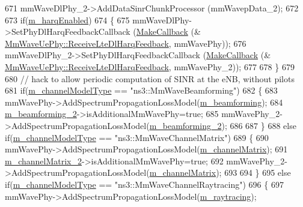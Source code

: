 \begin{DoxyCode}
671         mmWaveDlPhy\_2->AddDataSinrChunkProcessor (mmWavepData\_2);
672 
673         \textcolor{keywordflow}{if}(\hyperlink{classns3_1_1MmWaveHelper_a56142ee76b853ab0fa13918aeb6800e9}{m\_harqEnabled})
674         \{
675                 mmWaveDlPhy->SetPhyDlHarqFeedbackCallback (\hyperlink{group__makecallbackmemptr_ga9376283685aa99d204048d6a4b7610a4}{MakeCallback} (&
      \hyperlink{classns3_1_1MmWaveUePhy_ac00ac37c527f89a4e7a585cef8b95f4d}{MmWaveUePhy::ReceiveLteDlHarqFeedback}, mmWavePhy));
676                 mmWaveDlPhy\_2->SetPhyDlHarqFeedbackCallback (\hyperlink{group__makecallbackmemptr_ga9376283685aa99d204048d6a4b7610a4}{MakeCallback} (&
      \hyperlink{classns3_1_1MmWaveUePhy_ac00ac37c527f89a4e7a585cef8b95f4d}{MmWaveUePhy::ReceiveLteDlHarqFeedback}, mmWavePhy\_2));
677 
678         \}
679 
680         \textcolor{comment}{// hack to allow periodic computation of SINR at the eNB, without pilots}
681         \textcolor{keywordflow}{if}(\hyperlink{classns3_1_1MmWaveHelper_aec88d691230f0db9448a7f953301bb24}{m\_channelModelType} == \textcolor{stringliteral}{"ns3::MmWaveBeamforming"})
682         \{
683                 mmWavePhy->AddSpectrumPropagationLossModel(\hyperlink{classns3_1_1MmWaveHelper_a4fa071b6d755f32a684906150660b381}{m\_beamforming});
684                 \hyperlink{classns3_1_1MmWaveHelper_a3406a28781481686589a5275787bf43f}{m\_beamforming\_2}->isAdditionalMmWavePhy=\textcolor{keyword}{true};
685                 mmWavePhy\_2->AddSpectrumPropagationLossModel(\hyperlink{classns3_1_1MmWaveHelper_a3406a28781481686589a5275787bf43f}{m\_beamforming\_2});
686 
687         \}
688         \textcolor{keywordflow}{else} \textcolor{keywordflow}{if}(\hyperlink{classns3_1_1MmWaveHelper_aec88d691230f0db9448a7f953301bb24}{m\_channelModelType} == \textcolor{stringliteral}{"ns3::MmWaveChannelMatrix"})
689         \{
690                 mmWavePhy->AddSpectrumPropagationLossModel(\hyperlink{classns3_1_1MmWaveHelper_a731a9e28a12edacd78b96800025db070}{m\_channelMatrix});
691                 \hyperlink{classns3_1_1MmWaveHelper_af2907a9f5719984dfef74e3736e35bc5}{m\_channelMatrix\_2}->isAdditionalMmWavePhy=\textcolor{keyword}{true};
692                 mmWavePhy\_2->AddSpectrumPropagationLossModel(\hyperlink{classns3_1_1MmWaveHelper_a731a9e28a12edacd78b96800025db070}{m\_channelMatrix});
693 
694         \}
695         \textcolor{keywordflow}{else} \textcolor{keywordflow}{if}(\hyperlink{classns3_1_1MmWaveHelper_aec88d691230f0db9448a7f953301bb24}{m\_channelModelType} == \textcolor{stringliteral}{"ns3::MmWaveChannelRaytracing"})
696         \{
697                 mmWavePhy->AddSpectrumPropagationLossModel(\hyperlink{classns3_1_1MmWaveHelper_a99e1ebbb84d122ea60a9fe7c1bb44528}{m\_raytracing});

\end{DoxyCode}
